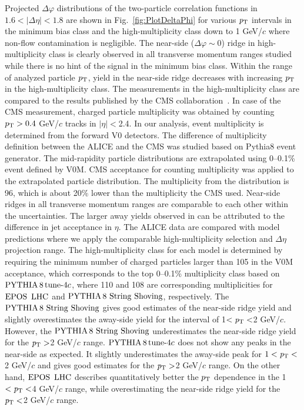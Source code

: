 Projected $\Delta\varphi$ distributions of the two-particle correlation functions in $1.6<|\Delta\eta|<1.8$ are shown in Fig.~\ref{fig:PlotDeltaPhi} for various $\it{p}_{\rm{T}}$ intervals in the minimum bias class and the high-multiplicity class down to 1 GeV/$c$ where non-flow contamination is negligible. The near-side ($\Delta\varphi\sim 0$) ridge in high-multiplicity class is clearly observed in all transverse momentum ranges studied while there is no hint of the signal in the minimum bias class. Within the range of analyzed particle $p_\mathrm{T}$, yield in the near-side ridge decreases with increasing $p_\mathrm{T}$ in the high-multiplicity class. The measurements in the high-multiplicity class are compared to the results published by the CMS collaboration~\cite{Khachatryan:2015lva}. In case of the CMS measurement, charged particle multiplicity was obtained by counting $p_\mathrm{T}>0.4$ GeV/$c$ tracks in $|\eta|<$2.4. In our analysis, event multiplicity is determined from the forward V0 detectors. The difference of multiplicity definition between the ALICE and the CMS was studied based on Pythia8 event generator. The mid-rapidity particle distributions are extrapolated using 0--0.1\% event defined by V0M. CMS acceptance for counting multiplicity was applied to the extrapolated particle distribution. The multiplicity from the distribution is 96, which is about 20\% lower than the multiplicity the CMS used. %
Near-side ridges in all transverse momentum ranges are comparable to each other within the uncertainties. The larger away yields observed in \cite{Khachatryan:2015lva} can be attributed to the difference in jet acceptance in $\eta$. The ALICE data are compared with model predictions where we apply the comparable high-multiplicity selection and $\Delta\eta$ projection range. The high-multiplicity class for each model is determined by requiring the minimum number of charged particles larger than 105 in the V0M acceptance, which corresponds to the top 0--0.1\% multiplicity class based on $\mathrm{PYTHIA}\,8\,\mathrm{tune}{\text -}4c$, where 110 and 108 are corresponding multiplicities for ${\mathrm{EPOS}\,~\mathrm{LHC}}$ and ${\mathrm{PYTHIA}\,8~\mathrm{String}~}\mathrm{Shoving}$, respectively. The ${\mathrm{PYTHIA}\,8~\mathrm{String}~}\mathrm{Shoving}$ gives good estimates of the near-side ridge yield and slightly overestimates the away-side yield for the interval of 1$<\it{p}_{\rm{T}}<$2 GeV/$c$. However, the ${\mathrm{PYTHIA}\,8~\mathrm{String}~}\mathrm{Shoving}$ underestimates the near-side ridge yield for the $\it{p}_{\rm{T}}>$2 GeV/$c$ range. $\mathrm{PYTHIA}\,8\,\mathrm{tune}{\text -}4c$ does not show any peaks in the near-side as expected. It slightly underestimates the away-side peak for $1<\it{p}_{\rm{T}}<$2 GeV/$c$ and gives good estimates for the $\it{p}_{\rm{T}}>$2 GeV/$c$ range. On the other hand, ${\mathrm{EPOS}\,~\mathrm{LHC}}$ describes quantitatively better the $p_\mathrm{T}$ dependence in the 1$<\it{p}_{\rm{T}}<$4 GeV/$c$ range, while overestimating the near-side ridge yield for the $\it{p}_{\rm{T}}<$2 GeV/$c$ range. 


